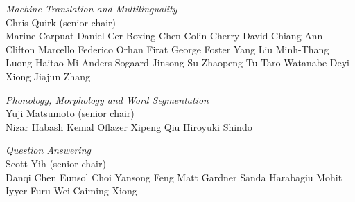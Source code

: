 \emph{Machine Translation and Multilinguality} \\
\hspace*{0.2in}Chris Quirk (senior chair) \\
\hspace*{0.2in}Marine Carpuat
\hspace*{0.2in}Daniel Cer
\hspace*{0.2in}Boxing Chen
\hspace*{0.2in}Colin Cherry
\hspace*{0.2in}David Chiang
\hspace*{0.2in}Ann Clifton
\hspace*{0.2in}Marcello Federico
\hspace*{0.2in}Orhan Firat
\hspace*{0.2in}George Foster
\hspace*{0.2in}Yang Liu
\hspace*{0.2in}Minh-Thang Luong
\hspace*{0.2in}Haitao Mi
\hspace*{0.2in}Anders Sogaard
\hspace*{0.2in}Jinsong Su
\hspace*{0.2in}Zhaopeng Tu
\hspace*{0.2in}Taro Watanabe
\hspace*{0.2in}Deyi Xiong
\hspace*{0.2in}Jiajun Zhang


\emph{Phonology, Morphology and Word Segmentation} \\
\hspace*{0.2in}Yuji Matsumoto (senior chair) \\ 
\hspace*{0.2in}Nizar Habash
\hspace*{0.2in}Kemal Oflazer
\hspace*{0.2in}Xipeng Qiu
\hspace*{0.2in}Hiroyuki Shindo


\emph{Question Answering} \\
\hspace*{0.2in}Scott Yih (senior chair) \\ 
\hspace*{0.2in}Danqi Chen
\hspace*{0.2in}Eunsol Choi
\hspace*{0.2in}Yansong Feng
\hspace*{0.2in}Matt Gardner
\hspace*{0.2in}Sanda Harabagiu
\hspace*{0.2in}Mohit Iyyer
\hspace*{0.2in}Furu Wei
\hspace*{0.2in}Caiming Xiong


